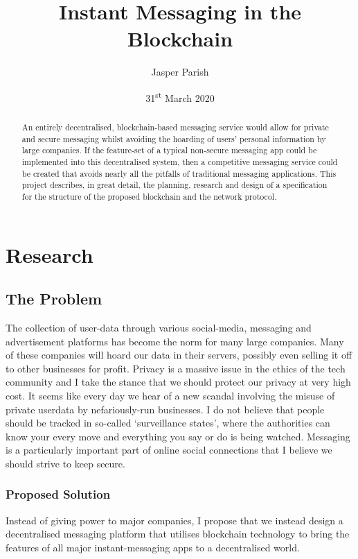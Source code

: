 \documentclass{article}
\title{Instant Messaging in the Blockchain}
\author{Jasper Parish}
\date{31\textsuperscript{st} March 2020}
\begin{document}
\maketitle
\begin{abstract}
    An entirely decentralised, blockchain-based messaging service would allow for private and secure messaging whilst avoiding the hoarding of users' personal information by large companies. If the feature-set of a typical non-secure messaging app could be implemented into this decentralised system, then a competitive messaging service could be created that avoids nearly all the pitfalls of traditional messaging applications. This project describes, in great detail, the planning, research and design of a specification for the structure of the proposed blockchain and the network protocol.
\end{abstract}

\newpage
\tableofcontents
\newpage

\section{Research}
\subsection{The Problem}
The collection of user-data through various social-media, messaging and advertisement platforms has become the norm for many large companies. Many of these companies will hoard our data in their servers, possibly even selling it off to other businesses for profit. Privacy is a massive issue in the ethics of the tech community and I take the stance that we should protect our privacy at very high cost. It seems like every day we hear of a new scandal involving the misuse of private userdata by nefariously-run businesses. I do not believe that people should be tracked in so-called `surveillance states', where the authorities can know your every move and everything you say or do is being watched. Messaging is a particularly important part of online social connections that I believe we should strive to keep secure.

\subsubsection{Proposed Solution}
Instead of giving power to major companies, I propose that we instead design a decentralised messaging platform that utilises blockchain technology to bring the features of all major instant-messaging apps to a decentralised world.
\end{document}
